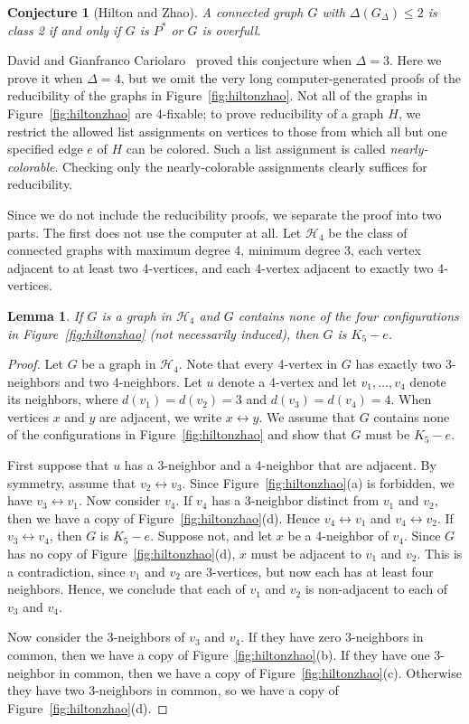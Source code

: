 \documentclass[12pt]{article}
\theoremstyle{plain}
\newtheorem{lem}[thm]{Lemma}
\newtheorem{conjecture}[thm]{Conjecture}
\theoremstyle{definition}
\theoremstyle{remark}
\newcommand{\fancy}[1]{\mathcal{#1}}
\def\adj{\leftrightarrow}
\def\H{\fancy{H}}
\begin{document}
\begin{conjecture}[Hilton and Zhao]
A connected graph $G$ with $\Delta(G_\Delta) \le 2$ is class 2 if and only if
$G$ is $P^*$ or $G$ is overfull.
\end{conjecture}

David and Gianfranco Cariolaro~\cite{cariolaro2003colouring} proved this
conjecture when $\Delta=3$.  Here we prove it when $\Delta=4$, but we
omit the very long computer-generated proofs of the reducibility of the
graphs in Figure~\ref{fig:hiltonzhao}.  Not all of the graphs in
Figure~\ref{fig:hiltonzhao} are $4$-fixable; to prove reducibility of a graph
$H$, we restrict the allowed list assignments on vertices to those from which
all but one specified edge $e$ of $H$ can be colored.  Such a list assignment
is called \emph{nearly-colorable}.  Checking only the nearly-colorable
assignments clearly suffices for reducibility.


Since we do not include the reducibility proofs, we separate the proof into two parts.  The first does not use the computer at all.
Let $\H_4$ be the class of connected graphs with maximum degree 4, minimum
degree 3, each vertex adjacent to at least two 4-vertices, and each 4-vertex
adjacent to exactly two 4-vertices.
\begin{lem}\label{HiltonZhaoLemma}
If $G$ is a graph in $\H_4$ and $G$ contains none of the four configurations in
Figure~\ref{fig:hiltonzhao} (not necessarily induced), then $G$ is $K_5-e$.
\end{lem}
\begin{proof}
Let $G$ be a graph in $\H_4$.  Note that every 4-vertex in $G$ has exactly two
3-neighbors and two 4-neighbors.  Let $u$ denote a 4-vertex and let
$v_1,\ldots,v_4$ denote its neighbors, where $d(v_1)=d(v_2)=3$ and $d(v_3)=d(v_4)=4$.
When vertices $x$ and $y$ are adjacent, we write $x\adj y$.  We assume that $G$
contains none of the configurations in Figure~\ref{fig:hiltonzhao} and show that
$G$ must be $K_5-e$.  
	
First suppose that $u$ has a 3-neighbor and a 4-neighbor that are adjacent.  By
symmetry, assume that $v_2\adj v_3$.  Since
Figure~\ref{fig:hiltonzhao}(a) is forbidden, we have $v_3\adj v_1$. 
Now consider $v_4$.  If $v_4$ has a 3-neighbor distinct from $v_1$ and $v_2$,
then we have a copy of Figure~\ref{fig:hiltonzhao}(d).  Hence $v_4\adj v_1$ and
$v_4\adj v_2$.  If $v_3\adj v_4$, then $G$ is $K_5-e$.  Suppose not, and let
$x$ be a 4-neighbor of $v_4$.  Since $G$ has no copy of
Figure~\ref{fig:hiltonzhao}(d), $x$ must be adjacent to $v_1$ and $v_2$.  This
is a contradiction, since $v_1$ and $v_2$ are 3-vertices, but now each has at
least four neighbors.  Hence, we conclude that each of $v_1$ and $v_2$ is
non-adjacent to each of $v_3$ and $v_4$.
	
Now consider the 3-neighbors of $v_3$ and $v_4$.  If they have zero 3-neighbors
in common, then we have a copy of Figure~\ref{fig:hiltonzhao}(b).  If they have
one 3-neighbor in common, then we have a copy of
Figure~\ref{fig:hiltonzhao}(c).  Otherwise they have two 3-neighbors in common,
so we have a copy of Figure~\ref{fig:hiltonzhao}(d).  
\end{proof}
\end{document}
